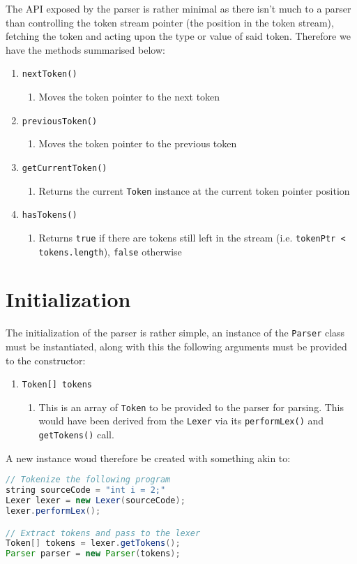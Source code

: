 The API exposed by the parser is rather minimal as there isn't much
to a parser than controlling the token stream pointer (the position
in the token stream), fetching the token and acting upon the type
or value of said token. Therefore we have the methods summarised below:
\begin{enumerate}
\item \texttt{nextToken()}
\begin{enumerate}
\item Moves the token pointer to the next token
\end{enumerate}
\item \texttt{previousToken()}
\begin{enumerate}
\item Moves the token pointer to the previous token
\end{enumerate}
\item \texttt{getCurrentToken()}
\begin{enumerate}
\item Returns the current \texttt{Token} instance at the current token
pointer position
\end{enumerate}
\item \texttt{hasTokens()}
\begin{enumerate}
\item Returns \texttt{true} if there are tokens still left in the stream
(i.e. \texttt{tokenPtr < tokens.length}), \texttt{false} otherwise
\end{enumerate}
\end{enumerate}

\section{Initialization}

The initialization of the parser is rather simple, an instance of
the \texttt{Parser} class must be instantiated, along with this the
following arguments must be provided to the constructor:
\begin{enumerate}
\item \texttt{Token[] tokens}
\begin{enumerate}
\item This is an array of \texttt{Token} to be provided to the parser for
parsing. This would have been derived from the \texttt{Lexer} via
its \texttt{performLex()} and \texttt{getTokens()} call.
\end{enumerate}
\end{enumerate}
A new instance woud therefore be created with something akin to:\begin{lstlisting}[language=Java]
// Tokenize the following program
string sourceCode = "int i = 2;"
Lexer lexer = new Lexer(sourceCode);
lexer.performLex();

// Extract tokens and pass to the lexer
Token[] tokens = lexer.getTokens();
Parser parser = new Parser(tokens);
\end{lstlisting}

